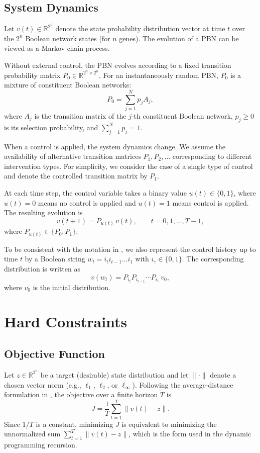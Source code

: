 \documentclass[12pt, a4paper]{report}
\begin{document}
\subsection{System Dynamics}
Let $v(t) \in \mathbb{R}^{2^n}$ denote the state probability distribution vector at time $t$ over the $2^n$ Boolean network states (for $n$ genes). The evolution of a PBN can be viewed as a Markov chain process.

Without external control, the PBN evolves according to a fixed transition probability matrix $P_0 \in \mathbb{R}^{2^n \times 2^n}$. For an instantaneously random PBN, $P_0$ is a mixture of constituent Boolean networks:
\begin{equation}
	P_0 = \sum_{j=1}^{N} p_j A_j,
\end{equation}
where $A_j$ is the transition matrix of the $j$-th constituent Boolean network, $p_j \ge 0$ is its selection probability, and $\sum_{j=1}^{N} p_j = 1$.

When a control is applied, the system dynamics change. We assume the availability of alternative transition matrices $P_1, P_2, \dots$ corresponding to different intervention types. For simplicity, we consider the case of a single type of control and denote the controlled transition matrix by $P_1$.

At each time step, the control variable takes a binary value $u(t) \in \{0,1\}$, where $u(t)=0$ means no control is applied and $u(t)=1$ means control is applied. The resulting evolution is
\begin{equation}
	v(t+1) = P_{u(t)}\, v(t), \qquad t = 0,1,\dots,T-1,
\end{equation}
where $P_{u(t)} \in \{P_0,P_1\}$.

To be consistent with the notation in \cite{ching2009optimal}, we also represent the control history up to time $t$ by a Boolean string $w_t = i_t i_{t-1}\dots i_1$ with $i_\tau \in \{0,1\}$. The corresponding distribution is written as
\begin{equation}
	v(w_t) = P_{i_t} P_{i_{t-1}} \cdots P_{i_1}\, v_0,
\end{equation}
where $v_0$ is the initial distribution.

\section{Hard Constraints}

\subsection{Objective Function}
Let $z \in \mathbb{R}^{2^n}$ be a target (desirable) state distribution and let $\lVert \cdot \rVert$ denote a chosen vector norm (e.g., $\ell_1$, $\ell_2$, or $\ell_\infty$). Following the average-distance formulation in \cite{ching2009optimal}, the objective over a finite horizon $T$ is
\begin{equation}
	J = \frac{1}{T} \sum_{t=1}^{T} \lVert v(t) - z \rVert.
\end{equation}
Since $1/T$ is a constant, minimizing $J$ is equivalent to minimizing the unnormalized sum $\sum_{t=1}^{T} \lVert v(t) - z \rVert$, which is the form used in the dynamic programming recursion.
\end{document}
